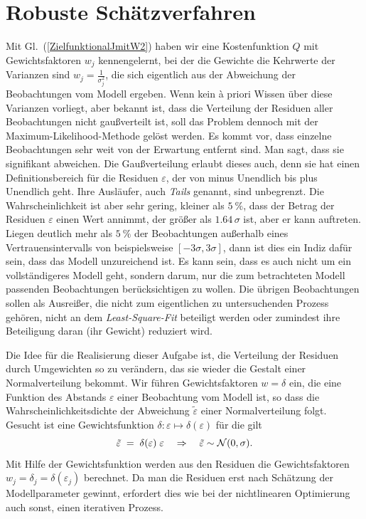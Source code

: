 \section{Robuste Schätzverfahren}
\label{robustEstimation}
Mit Gl.~(\ref{ZielfunktionalJmitW2}) haben wir eine Kostenfunktion $Q$ mit Gewichtsfaktoren $w_j$ kennengelernt,
bei der die Gewichte die Kehrwerte der Varianzen sind $w_j = \frac{1}{\sigma_j^2}$, die sich eigentlich
aus der Abweichung der Beobachtungen vom Modell ergeben. Wenn kein {\`a} priori Wissen über
diese Varianzen vorliegt, aber bekannt ist, dass die Verteilung der
Residuen aller Beobachtungen nicht gauß\-ver\-teilt ist, soll das Problem dennoch mit der
Maximum-Likelihood-Methode gelöst werden. Es kommt vor, dass einzelne Beobachtungen
sehr weit von der Erwartung entfernt sind. Man sagt, dass sie signifikant abweichen. Die Gaußverteilung erlaubt dieses auch, denn sie hat einen Definitionsbereich für die Residuen $\varepsilon$,
der von minus Unendlich bis plus Unendlich geht. Ihre Ausläufer, auch \textsl{Tails} genannt,
sind unbegrenzt. Die Wahrscheinlichkeit ist aber sehr gering, kleiner als $5~\%$, dass der Betrag der
Residuen $\varepsilon$ einen Wert annimmt, der größer als
$1.64 \, \sigma$ ist, aber er kann auftreten. Liegen deutlich mehr als $5~\%$
der Beobachtungen außerhalb eines Vertrauensintervalls von beispielsweise $[-3 \sigma, 3 \sigma]$,
dann ist dies ein Indiz dafür sein, dass das Modell unzureichend ist. Es kann sein, dass es auch nicht
um ein vollständigeres Modell geht, sondern darum, nur die zum betrachteten Modell passenden Beobachtungen
berücksichtigen zu wollen. Die übrigen Beobachtungen sollen als Ausreißer, die nicht zum
eigentlichen zu untersuchenden Prozess gehören, nicht an dem \textsl{Least-Square-Fit}
beteiligt werden oder zumindest ihre Beteiligung daran (ihr Gewicht) reduziert wird.

Die Idee für die Realisierung dieser Aufgabe ist, die Verteilung der Residuen durch Umgewichten so zu verändern, das
sie wieder die Gestalt einer Normalverteilung bekommt. Wir führen Gewichtsfaktoren $w = \delta$ ein,
die eine Funktion des Abstands $\varepsilon$ einer Beobachtung vom Modell ist, so dass die Wahrscheinlichkeitsdichte
der Abweichung $\tilde \varepsilon$ einer Normalverteilung folgt. Gesucht ist eine Gewichtsfunktion
$\delta \! : \varepsilon \mapsto \delta(\varepsilon)$ für die gilt
\begin{equation}
\tilde \varepsilon \; = \; \delta(\varepsilon) \; \varepsilon \quad \Rightarrow
\quad \tilde \varepsilon \sim {\cal N}(0,\sigma) .
\end{equation}
Mit Hilfe der Gewichtsfunktion werden aus den Residuen die Gewichtsfaktoren
$w_j = \delta_j = \delta(\varepsilon_j)$ berechnet. Da man die Residuen erst nach
Schätzung der Modellparameter gewinnt, erfordert dies wie bei der nichtlinearen Optimierung
auch sonst, einen iterativen Prozess.

